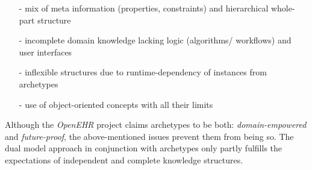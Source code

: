 \begin{itemize}
    \item[-] mix of meta information (properties, constraints) and hierarchical whole-part structure
    \item[-] incomplete domain knowledge lacking logic (algorithms/ workflows) and user interfaces
    \item[-] inflexible structures due to runtime-dependency of instances from archetypes
    \item[-] use of object-oriented concepts with all their limits
\end{itemize}

Although the \emph{OpenEHR} project claims archetypes to be both:
\emph{domain-empowered} and \emph{future-proof}, the above-mentioned issues
prevent them from being so. The dual model approach in conjunction with
archetypes only partly fulfills the expectations of independent and complete
knowledge structures.

